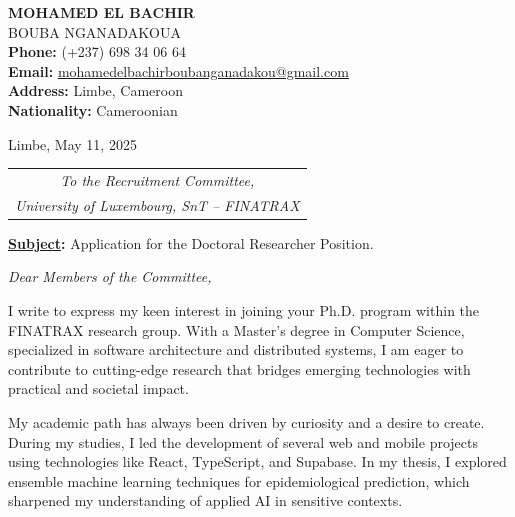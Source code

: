 \documentclass[12pt,a4paper]{letter}
\begin{document}
	
	\noindent
	\begin{minipage}[t]{0.65\textwidth}
		\textbf{MOHAMED EL BACHIR} \\
		BOUBA NGANADAKOUA \\
		\textbf{Phone:} (+237) 698 34 06 64 \\
		\textbf{Email:} \href{mailto:mohamedelbachirboubanganadakou@gmail.com}{mohamedelbachirboubanganadakou@gmail.com} \\
		\textbf{Address:} Limbe, Cameroon \\
		\textbf{Nationality:} Cameroonian
	\end{minipage}
	\hfill
	\begin{minipage}[t]{0.3\textwidth}
		\raggedleft
		Limbe, May 11, 2025
	\end{minipage}
	
	\vspace{0.5cm}
	
	\begin{FlushRight}
		\begin{minipage}[t]{0.5\textwidth}
			\begin{tabular}{c}
				\textit{To the Recruitment Committee,} \\
				\textit{University of Luxembourg, SnT – FINATRAX}
			\end{tabular}
		\end{minipage}
	\end{FlushRight}
	
	\vspace{1.5em}
	
	\noindent
	\textbf{\underline{Subject}:} Application for the Doctoral Researcher Position. \\[1em]
	
	\justifying
	\begin{center}
		\textit{Dear Members of the Committee,}
	\end{center}
	
	\vspace{1em}
	
	\qquad I write to express my keen interest in joining your Ph.D. program within the FINATRAX research group. With a Master’s degree in Computer Science, specialized in software architecture and distributed systems, I am eager to contribute to cutting-edge research that bridges emerging technologies with practical and societal impact.
	
	\qquad My academic path has always been driven by curiosity and a desire to create. During my studies, I led the development of several web and mobile projects using technologies like React, TypeScript, and Supabase. In my thesis, I explored ensemble machine learning techniques for epidemiological prediction, which sharpened my understanding of applied AI in sensitive contexts.
	
\end{document}
